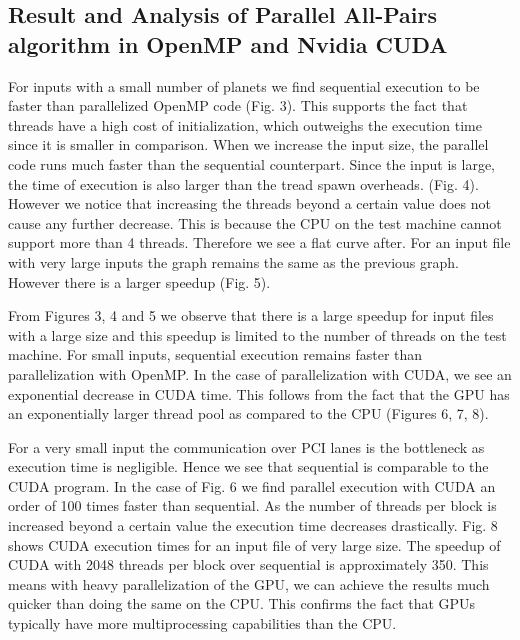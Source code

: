 \documentclass[letterpaper, 10 pt, conference]{ieeeconf}
\begin{document}
\subsection{Result and Analysis of Parallel All-Pairs algorithm in  OpenMP and Nvidia CUDA}



For inputs with a small number of planets we find sequential execution to be faster than parallelized OpenMP code (Fig. 3). This supports the fact that threads have a high cost of initialization, which outweighs the execution time since it is smaller in comparison. When we increase the input size, the parallel code runs much faster than the sequential counterpart. Since the input is large, the time of execution is also larger than the tread spawn overheads. (Fig. 4). However we notice that increasing the threads beyond a certain value does not cause any further decrease. This is because the CPU on the test machine cannot support more than 4 threads. Therefore we see a flat curve after. For an input file with very large inputs the graph remains the same as the previous graph. However there is a larger speedup (Fig. 5). \par

From Figures 3, 4 and 5 we observe that there is a large speedup for input files with a large size and this speedup is limited to the number of threads on the test machine. For small inputs, sequential execution remains faster than parallelization with OpenMP. In the case of parallelization with CUDA, we see an exponential decrease in CUDA time. This follows from the fact that the GPU has an exponentially larger thread pool as compared to the CPU (Figures 6, 7, 8). \par

For a very small input the communication over PCI lanes is the bottleneck as execution time is negligible. Hence we see that sequential is comparable to the CUDA program. In the case of Fig. 6 we find parallel execution with CUDA an order of 100 times faster than sequential. As the number of threads per block is increased beyond a certain value the execution time decreases drastically. Fig. 8 shows CUDA execution times for an input file of very large size. The speedup of CUDA with 2048 threads per block over sequential is approximately 350. This means with heavy parallelization of the GPU, we can achieve the results much quicker than doing the same on the CPU. This confirms the fact that GPUs typically have more multiprocessing capabilities than the CPU.
\end{document}
